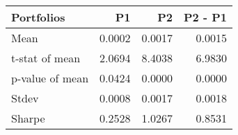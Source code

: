 \begin{tabular}{lrrr}
\toprule
Portfolios & P1 & P2 & P2 - P1 \\
\midrule
Mean & 0.0002 & 0.0017 & 0.0015 \\
t-stat of mean & 2.0694 & 8.4038 & 6.9830 \\
p-value of mean & 0.0424 & 0.0000 & 0.0000 \\
Stdev & 0.0008 & 0.0017 & 0.0018 \\
Sharpe & 0.2528 & 1.0267 & 0.8531 \\
\bottomrule
\end{tabular}
